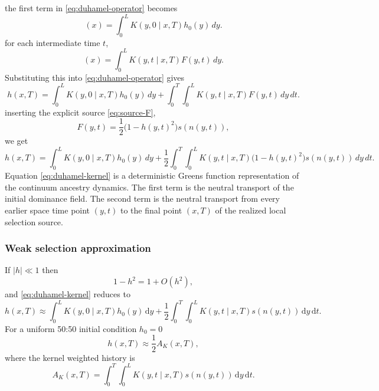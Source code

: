 \documentclass[11pt,a4paper]{report}
\newcommand{\dd}{\,\mathrm d}
\begin{document}
	the first term in \eqref{eq:duhamel-operator} becomes
	\begin{equation}
		[P(T,0)h_0](x)
		=
		\int_0^L K(y,0\mid x,T)h_0(y)\,dy .
	\end{equation}
	for each intermediate time \(t\),
	\begin{equation}
		[P(T,t)F(\cdot,t)](x)
		=
		\int_0^L K(y,t\mid x,T)F(y,t)\,dy .
	\end{equation}
	Substituting this into \eqref{eq:duhamel-operator} gives
	\begin{equation}
		h(x,T)
		=
		\int_0^L K(y,0\mid x,T)h_0(y)\,dy
		+
		\int_0^T\int_0^L
		K(y,t\mid x,T)F(y,t)\,dy\,dt .
		\label{eq:duhamel-kernel-before-source}
	\end{equation}
	inserting the explicit source
	\eqref{eq:source-F},
	\begin{equation}
		F(y,t)
		=
		\frac12\bigl(1-h(y,t)^2\bigr)s(n(y,t)),
	\end{equation}
	we get
	\begin{equation}
		{
			h(x,T)
			=
			\int_0^L K(y,0\mid x,T)h_0(y)\,dy
			+
			\frac12
			\int_0^T\int_0^L
			K(y,t\mid x,T)
			\bigl(1-h(y,t)^2\bigr)s(n(y,t))\,dy\,dt .
		}
		\label{eq:duhamel-kernel}
	\end{equation}
	Equation \eqref{eq:duhamel-kernel} is a deterministic
	Greens function representation of the continuum ancestry dynamics. The first
	term is the neutral transport of the initial dominance field. The second term
	is the neutral transport from every earlier space time point \((y,t)\) to the
	final point \((x,T)\) of the realized local selection source.
	\subsubsection{Weak selection approximation}
	
	If \(|h|\ll1\) then
	\begin{equation}
		1-h^2=1+O(h^2),
	\end{equation}
	and \cref{eq:duhamel-kernel} reduces to
	\begin{equation}
		h(x,T)\approx
		\int_0^L K(y,0\mid x,T)h_0(y)\dd y
		+\frac12\int_0^T\int_0^L K(y,t\mid x,T)
		s(n(y,t))\dd y\dd t.
		\label{eq:weak-continuum}
	\end{equation}
	For a uniform 50:50 initial condition \(h_0=0\)
	\begin{equation}
		h(x,T)\approx\frac12 A_K(x,T),
		\label{eq:h-ak}
	\end{equation}
	where the kernel weighted history is
	\begin{equation}
		A_K(x,T)=\int_0^T\int_0^L K(y,t\mid x,T)s(n(y,t))\dd y\dd t.
		\label{eq:AK}
	\end{equation}
\end{document}
